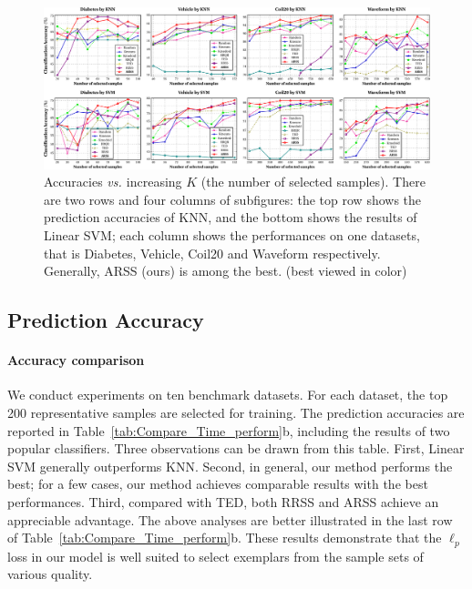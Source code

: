 \documentclass[a4paper]{article}
\begin{document}
\begin{figure}[t]
\centering{}\includegraphics[width=2.1\columnwidth]{4F__important_doingWork_myWorks_AAAI2015_figs_accuracy_vs_K_4Datasets-crop.pdf}\caption{{\small{Accuracies }}\emph{\small{vs. }}{\small{increasing $K$ (the
number of selected samples). There are two rows and four columns of
subfigures: the top row shows the prediction accuracies of KNN, and
the bottom shows the results of Linear SVM; each column shows the
performances on one datasets,}}\emph{\small{ }}{\small{that is Diabetes,
Vehicle, Coil20 and Waveform respectively. Generally, ARSS (ours)
is among the best. (best viewed in color) \label{fig:accuracy_vs_K}}}}
\end{figure}



\subsection{Prediction Accuracy}


\paragraph{Accuracy comparison}

We conduct experiments on ten benchmark datasets. For each dataset,
the top 200 representative samples are selected for training. The
prediction accuracies are reported in Table\ \ref{tab:Compare_Time_perform}b,
including the results of two popular classifiers. Three observations
can be drawn from this table. First, Linear SVM generally outperforms
KNN. Second, in general, our method performs the best; for a few cases,
our method achieves comparable results with the best performances.
Third, compared with TED, both RRSS and ARSS achieve an appreciable
advantage. The above analyses are better illustrated  in the last
row of Table\ \ref{tab:Compare_Time_perform}b. These results demonstrate
that the $\ell_{p}$ loss in our model is well suited to select exemplars
from the sample sets of various quality.
\end{document}
